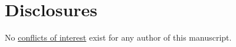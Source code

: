 \documentclass[paper=a4,twocolumn=true,DIV=calc,abstract,english]{scrartcl}
\begin{document}
\section*{Disclosures}
No \href{http://www.the-aps.org/mm/Publications/Preparing-Your-Manuscript#conflicts}{conflicts of interest} exist for any author of this manuscript.

\clearpage
\listoffigures

\clearpage
\doublespacing


\end{document}
